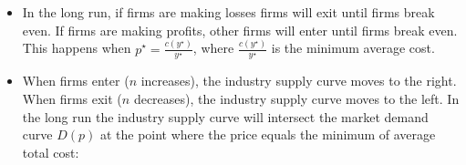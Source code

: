 \documentclass{article}
\begin{document}
\begin{itemize}
  \item In the long run, if firms are making losses firms will exit until firms
    break even. If firms are making profits, other firms will enter until firms
    break even. This happens when $p^\star = \frac{c\left( y^\star
    \right)}{y^\star}$, where $\frac{c\left( y^\star
    \right)}{y^\star}$ is the minimum average cost.
  \item When firms enter ($n$ increases), the industry supply curve moves to the right. When firms exit ($n$ decreases), the industry supply curve moves to the left. In the long run the industry supply curve will intersect the market demand curve $D\left( p \right)$ at the point where the price equals the minimum of average total cost:
\end{itemize}
\begin{center}
\end{center}
\end{document}
